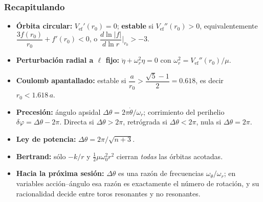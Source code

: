 \documentclass[10pt]{beamer}
\newcommand{\Vef}{V_{\mathrm{ef}}}
\newcommand{\dth}{\Delta\theta}          %
\newcommand{\dph}{\delta\varphi}         %
\begin{document}
\begin{frame}
\frametitle{Recapitulando}
\begin{itemize}
  \item<1-> \textbf{Órbita circular:} $\Vef'(r_0)=0$;
        \textbf{estable} si $\Vef''(r_0)>0$, equivalentemente
        $\dfrac{3f(r_0)}{r_0}+f'(r_0)<0$, o
        $\dfrac{d\ln|f|}{d\ln r}\Big|_{r_0}>-3$.
  \item<2-> \textbf{Perturbación radial a $\ell$ fijo:}
        $\ddot\eta+\omega_r^{2}\eta=0$ con
        $\omega_r^{2}=\Vef''(r_0)/\mu$.
  \item<3-> \textbf{Coulomb apantallado:} estable si
        $\dfrac{a}{r_0}>\dfrac{\sqrt5-1}{2}=0.618$, es decir
        $r_0<1.618\,a$.
  \item<4-> \textbf{Precesión:} ángulo apsidal
        $\dth=2\pi\dot\theta/\omega_r$; corrimiento del perihelio
        $\dph=\dth-2\pi$. Directa si $\dth>2\pi$, retrógrada si
        $\dth<2\pi$, nula si $\dth=2\pi$.
  \item<5-> \textbf{Ley de potencia:} $\dth=2\pi/\sqrt{n+3}$.
  \item<6-> \textbf{Bertrand:} sólo $-k/r$ y $\tfrac12\mu\omega_0^2r^{2}$ cierran
        \emph{todas} las órbitas acotadas.
  \item<7-> \textbf{Hacia la próxima sesión:} $\dth$ es una razón de frecuencias
        $\omega_\theta/\omega_r$; en variables acción--ángulo esa razón es
        exactamente el número de rotación, y su racionalidad decide entre
        toros resonantes y no resonantes.
\end{itemize}
\end{frame}
\end{document}
